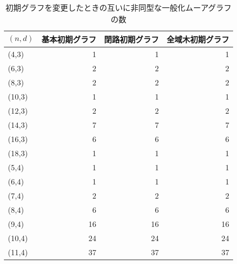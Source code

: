 \begin{table}[ht]
\centering
\caption{初期グラフを変更したときの互いに非同型な一般化ムーアグラフの数} 
\label{tab:ginitr-ngraph-iso}
\begin{tabular}{lrrr}
  \hline
$(n,d)$ & 基本初期グラフ & 閉路初期グラフ & 全域木初期グラフ \\ 
  \hline
(4,3) &   1 &   1 &   1 \\ 
  (6,3) &   2 &   2 &   2 \\ 
  (8,3) &   2 &   2 &   2 \\ 
  (10,3) &   1 &   1 &   1 \\ 
  (12,3) &   2 &   2 &   2 \\ 
  (14,3) &   7 &   7 &   7 \\ 
  (16,3) &   6 &   6 &   6 \\ 
  (18,3) &   1 &   1 &   1 \\ 
  (5,4) &   1 &   1 &   1 \\ 
  (6,4) &   1 &   1 &   1 \\ 
  (7,4) &   2 &   2 &   2 \\ 
  (8,4) &   6 &   6 &   6 \\ 
  (9,4) &  16 &  16 &  16 \\ 
  (10,4) &  24 &  24 &  24 \\ 
  (11,4) &  37 &  37 &  37 \\ 
   \hline
\end{tabular}
\end{table}
